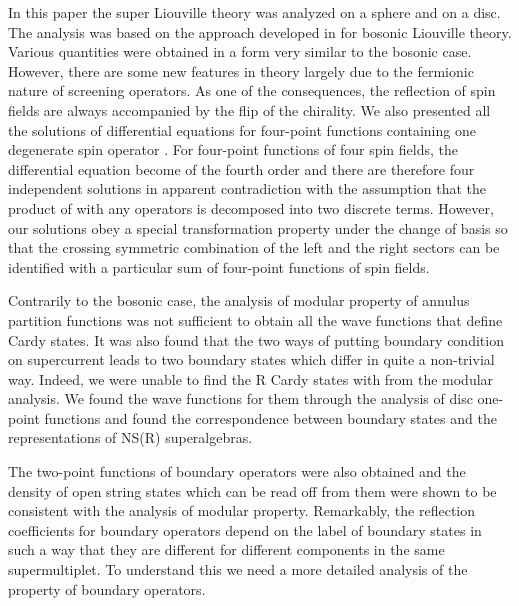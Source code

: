 \documentclass[a4paper,12pt]{article}
\providecommand{\ep}{{\epsilon}}
\begin{document}
   In this paper the \coordHE{} super Liouville theory was analyzed
 on a sphere and on a disc.
 The analysis was based on the approach developed in
 \cite{T,ZZ2,FZZ,ZZ} for bosonic Liouville theory.
 Various quantities were obtained in a form very similar to the
 bosonic case.
 However, there are some new features in \coordHE{} theory largely
 due to the fermionic nature of screening operators.
 As one of the consequences, the reflection of spin fields
 are always accompanied by the flip of the chirality.
 We also presented all the solutions of differential equations
 for four-point functions containing one degenerate spin operator
 \myHighlight{$\Theta_{-b/2}^{\ep}$}\coordHE{}.
 For four-point functions of four spin fields, the differential
 equation become of the fourth order and there are therefore four
 independent solutions in apparent contradiction with the assumption
 that the product of \myHighlight{$\Theta_{-b/2}^{\ep}$}\coordHE{} with any operators
 is decomposed into two discrete terms.
 However, our solutions obey a special transformation property
 under the change of basis so that the crossing symmetric combination
 of the left and the right sectors can be identified with
 a particular sum of four-point functions of spin fields.

   Contrarily to the bosonic case, the analysis of
 modular property of annulus partition functions was not
 sufficient to obtain all the wave functions that define Cardy
 states.
 It was also found that the two ways of putting boundary condition
 on supercurrent leads to two boundary states which differ in
 quite a non-trivial way.
 Indeed, we were unable to find the R Cardy states with \coordHE{}
 from the modular analysis.
 We found the wave functions for them through the analysis of
 disc one-point functions and found the correspondence between
 \coordHE{} boundary states and the representations
 of NS(R) superalgebras.

   The two-point functions of boundary operators were also obtained
 and the density of open string states which can be read off from
 them were shown to be consistent with the analysis of modular property.
 Remarkably, the reflection coefficients for boundary operators
 depend on the label of boundary states in such a way that they
 are different for different components in the same supermultiplet.
 To understand this we need a more detailed analysis of the property
 of boundary operators.
\end{document}
